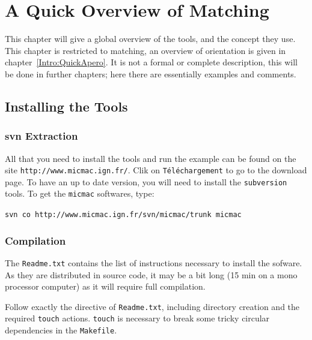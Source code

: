 \chapter{A Quick Overview of Matching}

This chapter will give a global overview of the tools, and the
concept they use.  This chapter is restricted to matching,
an overview of orientation is given in chapter~\ref{Intro:QuickApero}.
It is not a formal or complete description,  this
will be done in further chapters; here there are essentially examples
and comments.

\label{Intro:QuickR}


\section{Installing the Tools}


\subsection{svn Extraction}

All that you need to install the tools and run the example can be found on the site 
{\tt http://www.micmac.ign.fr/}. Clik on {\tt T\'el\'echargement} to go to the 
download page. To have an up to date version, you will need to install
the {\tt subversion} tools.  To get the {\tt micmac}  softwares, type:

{\tt svn co http://www.micmac.ign.fr/svn/micmac/trunk micmac }


\subsection{Compilation}

The {\tt Readme.txt} contains the list of instructions necessary to install
the sofware. As they are distributed in source code, it may be a bit long (15 min
on a mono processor computer)
as it will require full compilation.

Follow exactly the directive of {\tt Readme.txt}, including directory creation
and the required {\tt touch} actions. {\tt touch}  is necessary  to
break some tricky circular dependencies in the {\tt Makefile}.

